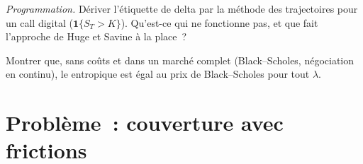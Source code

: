 \begin{exercise}[$\star\star\star$]\label{exo:ml:deep-hedging-and-machine-learning-in-pricing:7}
\emph{Programmation.} Dériver l'étiquette de delta par la méthode des trajectoires pour un call digital ($\mathbf1\{S_T > K\}$). Qu'est-ce qui
ne fonctionne pas, et que fait l'approche de Huge et Savine à la place~?
\end{exercise}

\begin{exercise}[$\star\star\star$]\label{exo:ml:deep-hedging-and-machine-learning-in-pricing:8}
Montrer que, sans coûts et dans un marché complet (Black--Scholes, négociation en continu), le  entropique est égal au prix de Black--Scholes pour tout $\lambda$.
\end{exercise}

\section{Problème~: couverture avec frictions}

